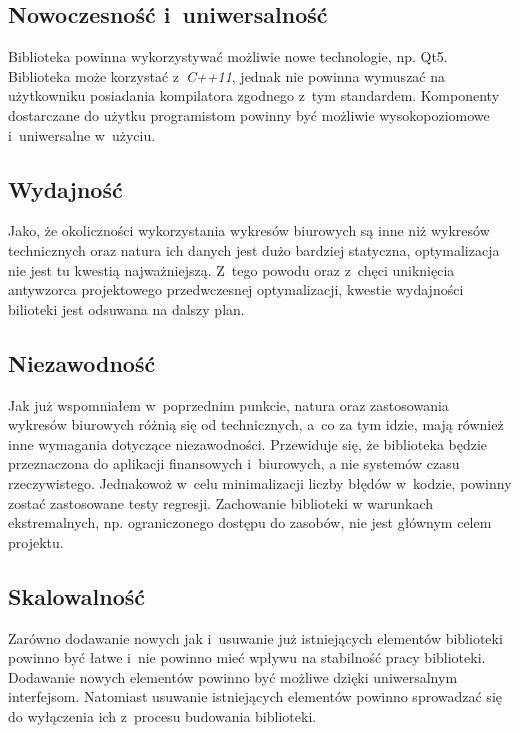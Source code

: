 \subsection{Nowoczesność i~uniwersalność}
Biblioteka powinna wykorzystywać możliwie nowe technologie, np. Qt5. Biblioteka może korzystać z~\textit{C++11}, jednak nie powinna wymuszać na użytkowniku posiadania kompilatora zgodnego z~tym standardem. Komponenty dostarczane do użytku programistom powinny być możliwie wysokopoziomowe i~uniwersalne w~użyciu.

\subsection{Wydajność}
Jako, że okoliczności wykorzystania wykresów biurowych są inne niż wykresów technicznych oraz natura ich danych jest dużo bardziej statyczna, optymalizacja nie jest tu kwestią najważniejszą. 
Z~tego powodu oraz z~chęci uniknięcia antywzorca projektowego przedwczesnej optymalizacji, kwestie wydajności bilioteki jest odsuwana na dalszy plan.

\subsection{Niezawodność}
Jak już wspomniałem w~poprzednim punkcie, natura oraz zastosowania wykresów biurowych różnią się od technicznych, a~co za tym idzie, mają również inne wymagania dotyczące niezawodności. Przewiduje się, że biblioteka będzie przeznaczona do aplikacji finansowych i~biurowych, a nie systemów czasu rzeczywistego. Jednakowoż w~celu minimalizacji liczby błędów w~kodzie, powinny zostać zastosowane testy regresji. Zachowanie biblioteki w warunkach ekstremalnych, np. ograniczonego dostępu do zasobów, nie jest głównym celem projektu.


\subsection{Skalowalność}
Zarówno dodawanie nowych jak i~usuwanie już istniejących elementów biblioteki powinno być łatwe i~nie powinno mieć wpływu na stabilność pracy biblioteki. Dodawanie nowych elementów powinno być możliwe dzięki uniwersalnym interfejsom. Natomiast usuwanie istniejących elementów powinno sprowadzać się do wyłączenia ich z~procesu budowania biblioteki.
